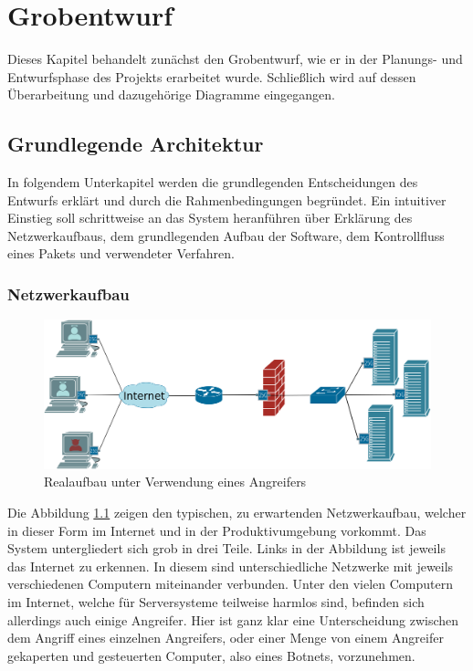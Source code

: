 \documentclass[../review_3.tex]{subfiles}
\begin{document}
\chapter{Grobentwurf}\thispagestyle{fancy}
Dieses Kapitel behandelt zunächst den Grobentwurf, wie er in der Planungs- und Entwurfsphase des Projekts erarbeitet wurde. Schließlich wird auf dessen Überarbeitung und dazugehörige Diagramme eingegangen.

\section{Grundlegende Architektur}
In folgendem Unterkapitel werden die grundlegenden Entscheidungen des Entwurfs erklärt und durch die Rahmenbedingungen begründet. Ein intuitiver Einstieg soll schrittweise an das System heranführen über Erklärung des Netzwerkaufbaus, dem grundlegenden Aufbau der Software, dem Kontrollfluss eines Pakets und verwendeter Verfahren.

\subsection{Netzwerkaufbau}
\begin{figure}[h]
    \centering
    \includegraphics[width=1.0\linewidth]{img/Netzwerkplan-Real}
    \caption{Realaufbau unter Verwendung eines Angreifers}
    \label{fig:netzwerkplan-real}
\end{figure}
Die Abbildung \ref{fig:netzwerkplan-real} zeigen den typischen, zu erwartenden Netzwerkaufbau, welcher in dieser Form im Internet und in der Produktivumgebung vorkommt. Das System untergliedert sich grob in drei Teile. Links in der Abbildung ist jeweils das Internet zu erkennen. In diesem sind unterschiedliche Netzwerke mit jeweils verschiedenen Computern miteinander verbunden. Unter den vielen Computern im Internet, welche für Serversysteme teilweise harmlos sind, befinden sich allerdings auch einige Angreifer. Hier ist ganz klar eine Unterscheidung zwischen dem Angriff eines einzelnen Angreifers, oder einer Menge von einem Angreifer gekaperten und gesteuerten Computer, also eines Botnets, vorzunehmen.
\end{document}
